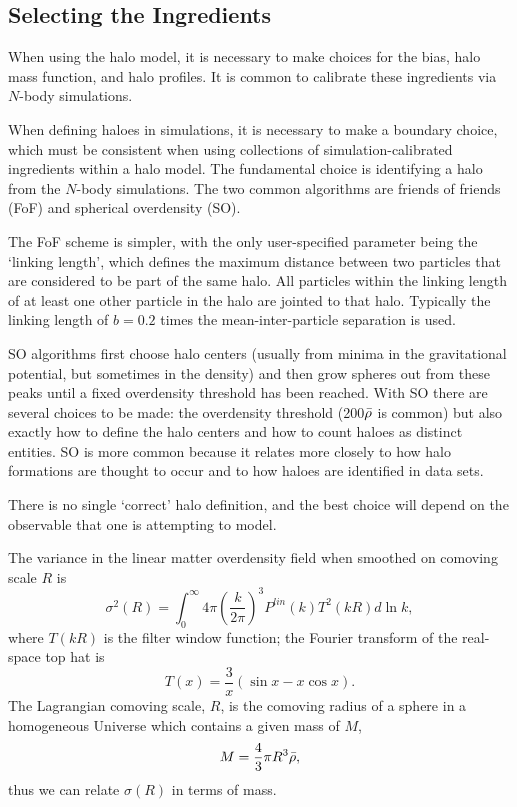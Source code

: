 \subsection{Selecting the Ingredients}
When using the halo model, it is necessary to make choices for the bias, halo mass function, and halo profiles. It is common to calibrate these ingredients via $N$-body simulations.

When defining haloes in simulations, it is necessary to make a boundary choice, which must be consistent when using collections of simulation-calibrated ingredients within a halo model. The fundamental choice is identifying a halo from the $N$-body simulations. The two common algorithms are friends of friends (FoF) and spherical overdensity (SO). 

The FoF scheme is simpler, with the only user-specified parameter being the `linking length', which defines the maximum distance between two particles that are considered to be part of the same halo. All particles within the linking length of at least one other particle in the halo are jointed to that halo. Typically the linking length of $b = 0.2$ times the mean-inter-particle separation is used. 

SO algorithms first choose halo centers (usually from minima in the gravitational potential, but sometimes in the density) and then grow spheres out from these peaks until a fixed overdensity threshold has been reached. With SO there are several choices to be made: the overdensity threshold (200$\Bar{\rho}$ is common) but also exactly how to define the halo centers and how to count haloes as distinct entities. SO is more common because it relates  more closely to how halo formations are thought to occur and to how haloes are identified in data sets. 

There is no single `correct' halo definition, and the best choice will depend on the observable that one is attempting to model. 

The variance in the linear matter overdensity field when smoothed on comoving scale $R$ is 
\begin{equation}
    \sigma^2(R) = \int_0^\infty 4\pi \left(\frac{k}{2\pi}\right)^3 P^{lin}(k) T^2(kR) d \ln k,
\end{equation}
where $T(kR)$ is the filter window function; the Fourier transform of the real-space top hat is
\begin{equation}
    T(x) = \frac{3}{x} (\sin x - x \cos x).
\end{equation}
The Lagrangian comoving scale, $R$, is the comoving radius of a sphere in a homogeneous Universe which contains a given mass of $M$,
\begin{equation}
    M = \frac{4}{3}\pi R^3 \Bar{\rho},
\end{equation}
thus we can relate $\sigma(R)$ in terms of mass.

